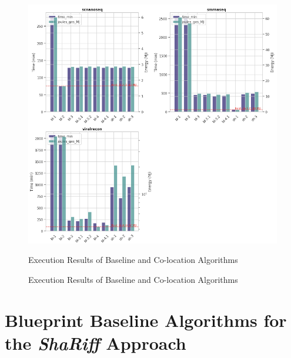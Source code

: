 \begin{figure}[H]
    \centering
    \includegraphics[scale=0.8]{fig/09/09_appendix_2.png}
    \small
    \caption{Execution Results of Baseline and Co-location Algorithms}
    \label{fig:09-rf}
    \tiny
    Execution Results of Baseline and Co-location Algorithms
\end{figure}
\section{Blueprint Baseline Algorithms for the \textit{ShaRiff} Approach}


